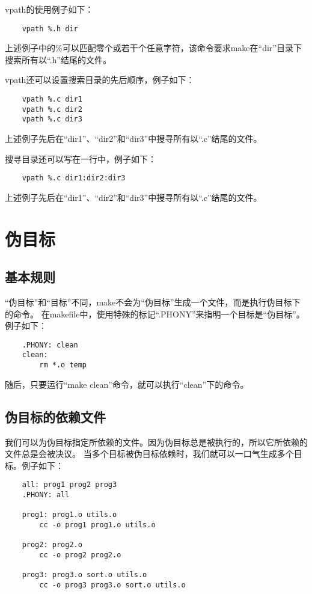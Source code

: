 \documentclass[a4paper,left=2.5cm,right=2.5cm,11pt]{article}
\begin{document}
	vpath的使用例子如下：
	\begin{lstlisting}
	vpath %.h dir
	\end{lstlisting}

	上述例子中的$\%$可以匹配零个或若干个任意字符，该命令要求make在“dir”目录下搜索所有以“.h”结尾的文件。\par

	vpath还可以设置搜索目录的先后顺序，例子如下：
	\begin{lstlisting}
	vpath %.c dir1
	vpath %.c dir2
	vpath %.c dir3
	\end{lstlisting}

	上述例子先后在“dir1”、“dir2”和“dir3”中搜寻所有以“.c”结尾的文件。\par

	搜寻目录还可以写在一行中，例子如下：
	\begin{lstlisting}
	vpath %.c dir1:dir2:dir3
	\end{lstlisting}

	上述例子先后在“dir1”、“dir2”和“dir3”中搜寻所有以“.c”结尾的文件。

\section{伪目标}
\subsection{基本规则}
	“伪目标”和“目标”不同，make不会为“伪目标”生成一个文件，而是执行伪目标下的命令。
	在makefile中，使用特殊的标记“.PHONY”来指明一个目标是“伪目标”。例子如下：
	\begin{lstlisting}
	.PHONY: clean
	clean:
		rm *.o temp
	\end{lstlisting}

	随后，只要运行“make clean”命令，就可以执行“clean”下的命令。

\subsection{伪目标的依赖文件}
	我们可以为伪目标指定所依赖的文件。因为伪目标总是被执行的，所以它所依赖的文件总是会被决议。
	当多个目标被伪目标依赖时，我们就可以一口气生成多个目标。例子如下：
	\begin{lstlisting}
	all: prog1 prog2 prog3
	.PHONY: all

	prog1: prog1.o utils.o
		cc -o prog1 prog1.o utils.o

	prog2: prog2.o
		cc -o prog2 prog2.o

	prog3: prog3.o sort.o utils.o
		cc -o prog3 prog3.o sort.o utils.o
	\end{lstlisting}
\end{document}
